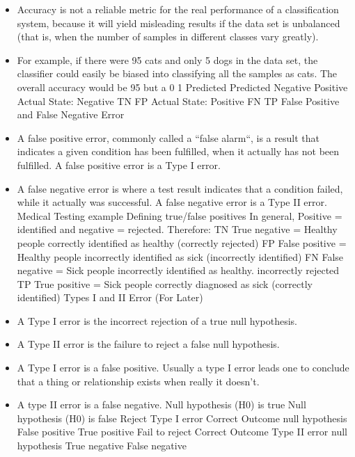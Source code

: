 \documentclass[a4paper,12pt]{article}
\begin{document}
\begin{itemize}
\item  Accuracy is not a reliable metric for the real performance of a classification system, because
it will yield misleading results if the data set is unbalanced (that is, when the number of
samples in different classes vary greatly).
\item  For example, if there were 95 cats and only 5 dogs in the data set, the classifier could
easily be biased into classifying all the samples as cats. The overall accuracy would be
95%
but a 0%
1
Predicted Predicted
Negative Positive
Actual State: Negative TN FP
Actual State: Positive FN TP
False Positive and False Negative Error
\item  A false positive error, commonly called a “false alarm“, is a result that indicates a given
condition has been fulfilled, when it actually has not been fulfilled. A false positive error is
a Type I error.
\item  A false negative error is where a test result indicates that a condition failed, while it actually
was successful. A false negative error is a Type II error.
Medical Testing example Defining true/false positives
In general, Positive = identified and negative = rejected. Therefore:
TN True negative = Healthy people correctly identified as healthy (correctly rejected)
FP False positive = Healthy people incorrectly identified as sick (incorrectly identified)
FN False negative = Sick people incorrectly identified as healthy. incorrectly rejected
TP True positive = Sick people correctly diagnosed as sick (correctly identified)
Types I and II Error (For Later)
\item  A Type I error is the incorrect rejection of a true null hypothesis.
\item  A Type II error is the failure to reject a false null hypothesis.
\item  A Type I error is a false positive. Usually a type I error leads one to conclude that a thing
or relationship exists when really it doesn’t.
\item  A type II error is a false negative.
Null hypothesis (H0) is true Null hypothesis (H0) is false
Reject Type I error Correct Outcome
null hypothesis False positive True positive
Fail to reject Correct Outcome Type II error
null hypothesis True negative False negative
\end{itemize}
\end{document}

